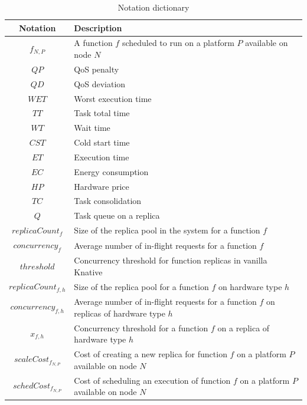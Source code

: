 \begin{table}[t]
    \caption{Notation dictionary}
    \begin{center}
    \begin{tabular}{|c|L|}
    \hline
    \textbf{Notation} & \textbf{Description} \\ \hline
    $f_{N, P}$ & A function $f$ scheduled to run on a platform $P$ available on node $N$ \\ \hline
    $QP$ & QoS penalty \\ \hline
    $QD$ & QoS deviation \\ \hline
    $WET$ & Worst execution time \\ \hline
    $TT$ & Task total time \\ \hline
    $WT$ & Wait time \\ \hline
    $CST$ & Cold start time \\ \hline
    $ET$ & Execution time \\ \hline
    $EC$ & Energy consumption \\ \hline
    $HP$ & Hardware price \\ \hline
    $TC$ & Task consolidation \\ \hline
    $Q$ & Task queue on a replica \\ \hline
    $replicaCount_{f}$ & Size of the replica pool in the system for a function $f$ \\ \hline
    $concurrency_{f}$ & Average number of in-flight requests for a function $f$ \\ \hline
    $threshold$ & Concurrency threshold for function replicas in vanilla Knative \\ \hline
    $replicaCount_{f, h}$ & Size of the replica pool for a function $f$ on hardware type $h$ \\ \hline
    $concurrency_{f, h}$ & Average number of in-flight requests for a function $f$ on replicas of hardware type $h$ \\ \hline
    $x_{f, h}$ & Concurrency threshold for a function $f$ on a replica of hardware type $h$ \\ \hline
    $scaleCost_{{f}_{N, P}}$ & Cost of creating a new replica for function $f$ on a platform $P$ available on node $N$ \\ \hline
    $schedCost_{{f}_{N, P}}$ & Cost of scheduling an execution of function $f$ on a platform $P$ available on node $N$ \\ \hline
    \end{tabular}
    \label{table:herofake-notation}
    \end{center}
\end{table}

